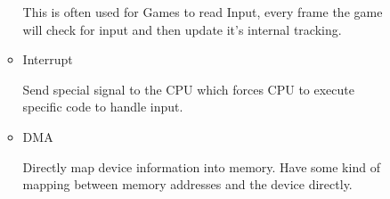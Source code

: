 \documentclass{report}
\begin{document}
\begin{description}
\begin{itemize}
\begin{itemize}
\begin{mdframed}
                            This is often used for Games to read Input, every
                            frame the game will check for input and then update
                            it's internal tracking.
                        \end{mdframed}
                    \item Interrupt
                        \begin{mdframed}
                            Send special signal to the CPU which
                            forces CPU to execute specific code to handle
                            input.
                        \end{mdframed}
                    \item DMA
                        \begin{mdframed}
                            Directly map device information into memory.
                            Have some kind of mapping between memory addresses
                            and the device directly.


\end{mdframed}
\end{itemize}
\end{itemize}
\end{description}
\end{document}
